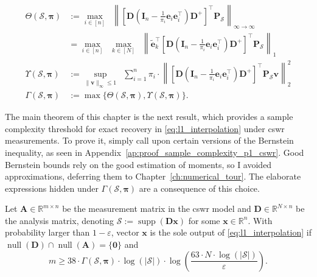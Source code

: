 \begin{definition}
    \begin{align}
        \Theta (\mathcal{S}, \bm{\pi}) & := \underset{i \in [n]}{\max} \enspace \left \| \left [ \mathbf{D} \left ( \mathbf{I}_n - \frac{1}{\pi_{i}}\mathbf{e}_{i} \mathbf{e}_{i}^\top \right ) \mathbf{D}^{+} \right ]^\top \mathbf{P}_{\mathcal{S}}\right \|_{\infty \to \infty} \\
        & = \underset{i \in [n]}{\max} \enspace \underset{k \in [N]}{\max} \enspace \left \| \tilde{\mathbf{e}}_k^{\top} \left [ \mathbf{D} \left ( \mathbf{I}_n - \frac{1}{\pi_{i}}\mathbf{e}_{i} \mathbf{e}_{i}^\top \right ) \mathbf{D}^{+} \right ]^\top \mathbf{P}_{\mathcal{S}}\right \|_{1} \\
        \Upsilon (\mathcal{S}, \bm{\pi}) & := \underset{\|\mathbf{v}\|_\infty \leq 1}{\sup} \enspace \sum_{i=1}^{n} \pi_i \cdot \left \| \left [ \mathbf{D} \left ( \mathbf{I}_n - \frac{1}{\pi_{i}}\mathbf{e}_{i} \mathbf{e}_{i}^\top \right ) \mathbf{D}^{+} \right ]^\top \mathbf{P}_{\mathcal{S}} \mathbf{v} \right \|_{2}^2\\
        \Gamma (\mathcal{S}, \bm{\pi}) & := \max \{ \Theta (\mathcal{S}, \bm{\pi}), \Upsilon (\mathcal{S}, \bm{\pi})\}.
    \end{align}
    \label{def:sample_complexity_parameters}
\end{definition}

The main theorem of this chapter is the next result, which provides a sample complexity threshold for exact recovery in \eqref{eq:l1_interpolation} under \acrshort{cswr} measurements. To prove it, simply call upon certain versions of the Bernstein inequality, as seen in Appendix~\ref{ap:proof_sample_complexity_p1_cswr}. Good Bernstein bounds rely on the good estimation of moments, so I avoided approximations, deferring them to Chapter~\ref{ch:numerical_tour}. The elaborate expressions hidden under $\Gamma (\mathcal{S}, \bm{\pi})$ are a consequence of this choice.

\begin{theorem}\label{thm:sample_complexity_p1_cswr}
    Let $\mathbf{A} \in \mathbb{R}^{m \times n}$ be the measurement matrix in the \acrshort{cswr} model and $\mathbf{D} \in \mathbb{R}^{N \times n}$ be the analysis matrix, denoting $\mathcal{S} := \operatorname{supp}\left ( \mathbf{Dx} \right )$ for some $\mathbf{x} \in \mathbb{R}^{n}$. With probability larger than $1 - \varepsilon$, vector $\mathbf{x}$ is the sole output of \eqref{eq:l1_interpolation} if $\operatorname{null} \left ( \mathbf{D} \right ) \cap \operatorname{null} \left ( \mathbf{A} \right ) = \{ \mathbf{0} \}$ and
    \begin{equation}
        m \geq 38 \cdot \Gamma(\mathcal{S}, \bm{\pi}) \cdot \log(|\mathcal{S}|) \cdot \log \left ( \frac{63 \cdot N \cdot\log (|\mathcal{S}|)}{\varepsilon} \right ).
    \end{equation}
\end{theorem}

